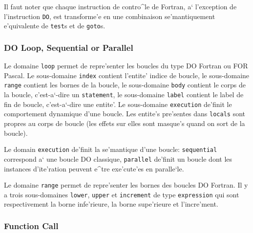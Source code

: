 {{Il faut noter que chaque instruction de contro^le de Fortran,
a` l'exception de l'instruction \verb/DO/, est
transforme'e en une combinaison se'mantiquement e'quivalente de \verb/test/s
et de \verb/goto/s.
}

\subsubsection{DO Loop, Sequential or Parallel}
\label{subsubsection-loop}

{
Le domaine \verb/loop/ permet de repre'senter les boucles du type DO Fortran
ou FOR Pascal. Le sous-domaine \verb/index/ contient l'entite' indice de
boucle, le sous-domaine \verb/range/ contient les bornes de la boucle, le
sous-domaine \verb/body/ contient le corps de la boucle, c'est-a`-dire un
\verb/statement/, le sous-domaine \verb/label/ contient le label de fin de boucle,
c'est-a`-dire une entite'. Le sous-domaine \verb/execution/ de'finit le
comportement dynamique d'une boucle. Les entite's pre'sentes dans
\verb/locals/ sont propres au corps de boucle (les effets sur elles sont
masque's quand on sort de la boucle).
}

{
Le domain \verb/execution/ de'finit la se'mantique d'une boucle:
\verb/sequential/ correspond a` une boucle DO classique, \verb/parallel/
de'finit un boucle dont les instances d'ite'ration peuvent e^tre
exe'cute'es en paralle`le.
}

\label{range}
{
Le domaine \verb/range/ permet de repre'senter les bornes des boucles DO
Fortran. Il y a trois sous-domaines \verb/lower/, \verb/upper/ et \verb/increment/ de
type \verb/expression/ qui sont respectivement la borne infe'rieure, la borne
supe'rieure et l'incre'ment.
}

\subsubsection{Function Call}
\label{subsubsection-call}

{}

}
